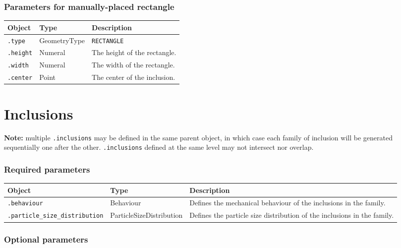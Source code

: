 \documentclass[10pt]{article}
\begin{document}
\subsubsection*{Parameters for manually-placed rectangle}

\begin{tabularx}{\textwidth}{llX}
\hline 
Object & Type & Description \\ 
\hline 
\verb+.type+ & GeometryType & \verb+RECTANGLE+ \\
\verb+.height+ & Numeral & The height of the rectangle. \\ 
\verb+.width+ & Numeral & The width of the rectangle. \\ 
\verb+.center+ & Point & The center of the inclusion. \\ 
\hline 
\end{tabularx}

\section{Inclusions}

\textbf{Note:} multiple \verb+.inclusions+ may be defined in the same parent object, in which case each family of inclusion will be generated sequentially one after the other. \verb+.inclusions+ defined at the same level may not intersect nor overlap.

\subsubsection*{Required parameters}

\begin{tabularx}{\textwidth}{llX}
\hline 
Object & Type & Description \\ 
\hline 
\verb+.behaviour+ & Behaviour & Defines the mechanical behaviour of the inclusions in the family. \\ 
\verb+.particle_size_distribution+ & ParticleSizeDistribution & Defines the particle size distribution of the inclusions in the family.\\ 
\hline 
\end{tabularx}

\subsubsection*{Optional parameters}
\end{document}
